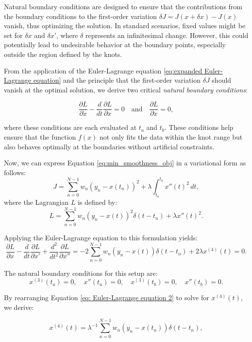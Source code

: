 \documentclass[
11pt, %
oneside, %
english, %
singlespacing, %
]{macthesis} %
\begin{document}
Natural boundary conditions are designed to ensure that the contributions from the boundary conditions to the first-order variation \(\delta J = J(x + \delta x) - J(x)\) vanish, thus optimizing the solution. In standard scenarios, fixed values might be set for \(\delta x\) and \(\delta x'\), where \(\delta\) represents an infinitesimal change. However, this could potentially lead to undesirable behavior at the boundary points, especially outside the region defined by the knots.

From the application of the Euler-Lagrange equation \ref{eq:expanded Euler-Lagrange equation} and the principle that the first-order variation \(\delta J\) should vanish at the optimal solution, we derive two critical \emph{natural boundary conditions}:

\[
\frac{\partial L}{\partial \dot{x}} - \frac{d}{dt} \frac{\partial L}{\partial \ddot{x}} = 0 \quad \text{and} \quad \frac{\partial L}{\partial \ddot{x}} = 0,
\]

where these conditions are each evaluated at \(t_a\) and \(t_b\). These conditions help ensure that the function \(f(x)\) not only fits the data within the knot range but also behaves optimally at the boundaries without artificial constraints.

Now, we can express Equation \ref{eq:min_smoothness_obj} in a variational form as follows:
\[
J = \sum_{n=0}^{N-1} w_n (y_n - x(t_n))^2 + \lambda \int_{t_a}^{t_b} x''(t)^2 \, dt,
\]
where the Lagrangian \(L\) is defined by:
\[
L = \sum_{n=0}^{N-1} w_n(y_n - x(t))^2 \delta(t - t_n) + \lambda x''(t)^2.
\]

Applying the Euler-Lagrange equation to this formulation yields:
\begin{equation}
\frac{\partial L}{\partial x} - \frac{d}{dt} \frac{\partial L}{\partial x'} + \frac{d^2}{dt^2} \frac{\partial L}{\partial x''} = -2 \sum_{n=0}^{N-1} w_{n}(y_n - x(t)) \delta(t - t_n) + 2\lambda x^{(4)}(t) = 0.
\label{eq: Euler-Lagrange equation 2}
\end{equation}

The natural boundary conditions for this setup are:
\[
x^{(3)}(t_a) = 0, \quad x''(t_a) = 0, \quad x^{(3)}(t_b) = 0, \quad x''(t_b) = 0.
\]

By rearranging Equation \ref{eq: Euler-Lagrange equation 2} to solve for \(x^{(4)}(t)\), we derive:

\begin{equation}
x^{(4)}(t) = \lambda^{-1} \sum_{n=0}^{N-1} w_n (y_n - x(t_n)) \delta(t - t_n),
\label{eq:EL x4}
\end{equation}
\end{document}
